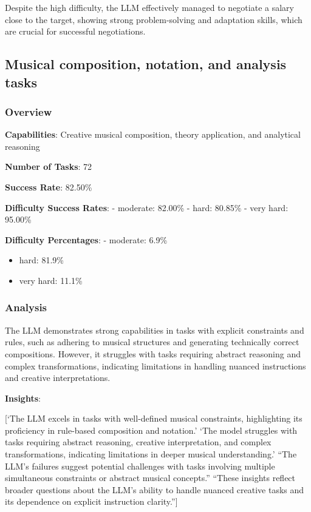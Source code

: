 \documentclass[fleqn,10pt]{wlscirep}
\begin{document}
Despite the high difficulty, the LLM effectively managed to negotiate a
salary close to the target, showing strong problem-solving and
adaptation skills, which are crucial for successful negotiations.

\hypertarget{musical-composition-notation-and-analysis-tasks}{%
\subsection{Musical composition, notation, and analysis
tasks}\label{musical-composition-notation-and-analysis-tasks}}

\hypertarget{overview-8}{%
\subsubsection{Overview}\label{overview-8}}

\textbf{Capabilities}: Creative musical composition, theory application,
and analytical reasoning

\textbf{Number of Tasks}: 72

\textbf{Success Rate}: 82.50\%

\textbf{Difficulty Success Rates}: - moderate: 82.00\% - hard: 80.85\% -
very hard: 95.00\%

\textbf{Difficulty Percentages}: - moderate: 6.9\%

\begin{itemize}
\item
  hard: 81.9\%
\item
  very hard: 11.1\%
\end{itemize}

\hypertarget{analysis-7}{%
\subsubsection{Analysis}\label{analysis-7}}

The LLM demonstrates strong capabilities in tasks with explicit
constraints and rules, such as adhering to musical structures and
generating technically correct compositions. However, it struggles with
tasks requiring abstract reasoning and complex transformations,
indicating limitations in handling nuanced instructions and creative
interpretations.

\textbf{Insights}:

{[}`The LLM excels in tasks with well-defined musical constraints,
highlighting its proficiency in rule-based composition and notation.'
`The model struggles with tasks requiring abstract reasoning, creative
interpretation, and complex transformations, indicating limitations in
deeper musical understanding.' ``The LLM's failures suggest potential
challenges with tasks involving multiple simultaneous constraints or
abstract musical concepts.'' ``These insights reflect broader questions
about the LLM's ability to handle nuanced creative tasks and its
dependence on explicit instruction clarity.''{]}
\end{document}
